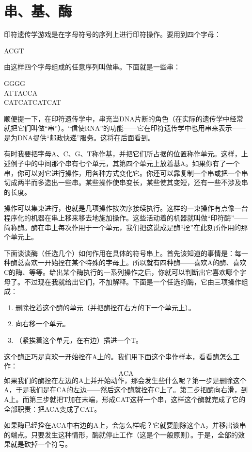 \section{串、基、酶}

印符遗传学游戏是在字母符号的序列上进行印符操作。要用到四个字母：
\begin{center}
A\quad C\quad G\quad T
\end{center}
由这样四个字母组成的任意序列叫做串。下面就是一些串：
\begin{center}
GGGG\\
ATTACCA\\
CATCATCATCAT
\end{center}
顺便提一下，在印符遗传学中，串充当DNA片断的角色（在实际的遗传学中经常就把它们叫做“串”）。“信使RNA”的功能——它在印符遗传学中也用串来表示——是为DNA提供“邮政快递”服务。这将在后面看到。

有时我要把字母A、C、G、T称作基，并把它们所占据的位置称作单元。这样，上述例子中的中间那个串有七个单元，其第四个单元上放着基A。如果你有了一个串，你可以对它进行操作，用各种方式变化它。你还可以靠复制一个串或把一个串切成两半而多造出一些串。某些操作使串变长，某些使其变短，还有一些不涉及串的长度。

操作可以集束进行，也就是几项操作按次序接续执行。这样的一束操作有点像一台程序化的机器在串上移来移去地施加操作。这些活动着的机器就叫做“印符酶”——简称酶。酶在串上每次作用于一个单元，我们把这说成是酶“拴”在此刻所作用的那个单元上。

下面谈谈酶（任选几个）如何作用在具体的符号串上。首先该知道的事情是：每一种酶总喜欢一开始拴在某个特殊的字母上。所以就有四种酶——喜欢A的酶、喜欢C的酶、等等。给出某个酶执行的一系列操作之后，你就可以判断出它喜欢哪个字母了。不过现在我就给出它们，不加解释。下面是一个任选的酶，它由三项操作组成：
\begin{enumerate}
\item 删除拴着这个酶的单元（并把酶拴在右方的下一个单元上）。
\item 向右移一个单元。
\item （紧挨着这个单元，在右边）插进一个T。
\end{enumerate}
这个酶正巧是喜欢一开始拴在A上的。我们用下面这个串作样本，看看酶怎么工作：
\[
\mathrm{ACA}
\]
如果我们的酶拴在左边的A上并开始动作，那会发生些什么呢？第一步是删除这个A，于是我们是在CA的左边——然后这个酶就拴在C上了。第二步把酶向右滑，到A上。而第三步就把T加在末端，形成CAT这样一个串，这样这个酶就完成了它的全部职责：把ACA变成了CAT。

如果酶已经拴在ACA中右边的A上，会怎么样呢？它就要删除这个A，并移出该串的端点。只要发生这种情形，酶就停止工作（这是个一般原则）。于是，全部的效果就是砍掉一个符号。


